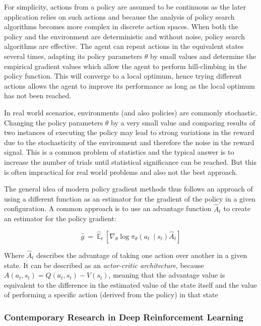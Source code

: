 For simplicity, actions from a policy are assumed to be continuous as the later application relies on
such actions and because the analysis of policy search algorithms becomes more complex in discrete action spaces. When
both the policy and the environment are deterministic and without noise, policy search algorithms are effective.
The agent can repeat actions in the equivalent states several times, adapting its policy parameters $\theta$ by small
values and determine the empirical gradient values which allow the agent to perform hill-climbing in the policy
function. This will converge to a local optimum, hence trying different actions allows the agent to improve its
performance as long as the local optimum has not been reached.

In real world scenarios, environments (and also policies) are commonly stochastic. Changing the policy
parameters $\theta$ by a very small value and comparing results of two instances of executing the policy may lead to
strong variations in the reward due to the stochasticity of the environment and therefore the noise in the reward
signal. This is a common problem of statistics and the typical answer is to increase the number of trials until
statistical significance can be reached. But this is often impractical for real world problems and also not the best
approach.

The general idea of modern policy gradient methods thus follows an approach of using a different function as an
estimator for the gradient of the policy in a given configuration. A common approach is to use an advantage function
$\hat{A}_t$ to create an estimator for the policy gradient:


\begin{equation}
    \hat{g} \ =\ \hat{\mathbb{E}}_{t} \ \left[ \nabla _{\theta }\log \pi _{\theta }( a_{t} \ \mid s_{t})\hat{A}_{t}  \right]
\end{equation}

Where $\hat{A}_t$ describes the advantage of taking one action over another in a given state. It can be
described as an \emph{actor-critic architecture}, because $A(a_t, s_t) = Q(a_t,s_t) - V(s_t)$, meaning that the
advantage value is equivalent to the difference in the estimated value of the state itself and the value of performing
a specific action (derived from the policy) in that state \citep{mnih2016asynchronous}

\subsubsection{Contemporary Research in Deep Reinforcement Learning}%
\label{sub:deep_learning_in_reinforcement_settings}

